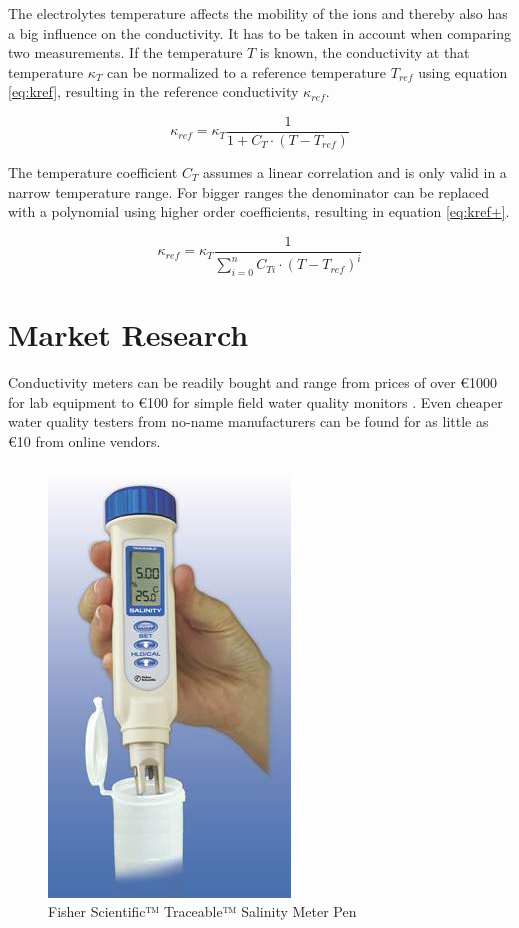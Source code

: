 The electrolytes temperature affects the mobility of the ions and thereby also has a big influence on the conductivity. It has to be taken in account when comparing two measurements. If the temperature $ T $ is known, the conductivity at that temperature $ \kappa_{T} $ can be normalized to a reference temperature $ T_{ref} $ using equation \eqref{eq:kref}, resulting in the reference conductivity $ \kappa_{ref} $.

\begin{equation}
	\kappa_{ref} = \kappa_{T} \frac{1}{1 + C_{T} \cdot (T - T_{ref})}
\label{eq:kref}
\end{equation}

The temperature coefficient $ C_{T} $ assumes a linear correlation and is only valid in a narrow temperature range. For bigger ranges the denominator can be replaced with a polynomial using higher order coefficients, resulting in equation \eqref{eq:kref+}.

\begin{equation}
	\kappa_{ref} = \kappa_{T} \frac{1}{\sum\limits_{i=0}^n C_{Ti} \cdot (T - T_{ref})^{i}}
\label{eq:kref+}
\end{equation}

\section{Market Research}

Conductivity meters can be readily bought and range from prices of over \euro{1000} for lab equipment \parencite{expcm} to \euro{100} for simple field water quality monitors \parencite{cheapcm}. Even cheaper water quality testers from no-name manufacturers can be found for as little as \euro{10} from online vendors.

\begin{figure}[H]
	\begin{center}
    	\tikzset{external/export next=false}
		\includegraphics[scale=0.5]{images/ccm.jpg}
		\caption{Fisher Scientific™ Traceable™ Salinity Meter Pen \parencite{cheapcm}}
		\label{fig:ccm}
	\end{center}
\end{figure}

